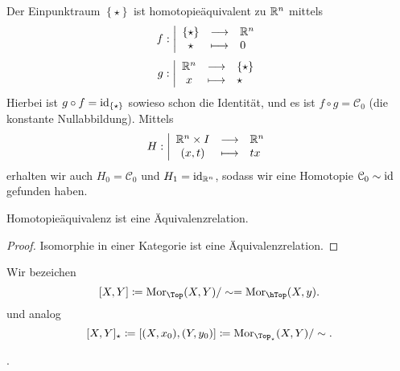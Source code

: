 \begin{example}
    Der Einpunktraum $\left \{\star\right\}$ ist homotopieäquivalent zu $\mathbb{R}^n$ mittels
        \begin{equation*}
        f: \left| \begin{array}{c c l} 
        \left \{\star\right\}  & \longrightarrow & \mathbb{R}^n \\
        \star & \longmapsto &  0
        \end{array} \right.
    \end{equation*}
        \begin{equation*}
        g: \left| \begin{array}{c c l} 
        \mathbb{R}^n & \longrightarrow & \left \{\star\right\} \\
        x & \longmapsto &  \star
        \end{array} \right.
    \end{equation*}
    Hierbei ist $g \circ  f = \mathrm{id}_{\left \{\star\right\} }$ sowieso schon die Identität, und es ist $f \circ  g = \mathcal{C}_0$ (die konstante Nullabbildung). Mittels
        \begin{equation*}
        H: \left| \begin{array}{c c l} 
        \mathbb{R}^n\times I & \longrightarrow & \mathbb{R}^n \\
        (x,t) & \longmapsto &  tx
        \end{array} \right.
    \end{equation*}
    erhalten wir auch $H_0 = \mathcal{C}_0$ und $H_1 = \mathrm{id}_{\mathbb{R}^n}$, sodass wir eine Homotopie $\mathcal{C}_0 \sim \mathrm{id}$ gefunden haben.
\end{example}

\begin{lemma}\label{lm:homotopieäquivalenz-ist-äquivalenzrelation}
Homotopieäquivalenz ist eine Äquivalenzrelation.    
\end{lemma}

\begin{proof}
    Isomorphie in einer Kategorie ist eine Äquivalenzrelation.
\end{proof}


\begin{notation}
    Wir bezeichen
    \[
        [X,Y] \coloneqq  \Mor_{\Top}(X,Y) / \sim = \Mor_{\hTop}(X,y)
    .\] 
    und analog
    \[
        [X,Y]_{\star} \coloneqq  [(X,x_0),(Y,y_0)] \coloneqq  \Mor_{\Top_{\star}}(X,Y) / \sim 
    .\] 
\end{notation}
.

